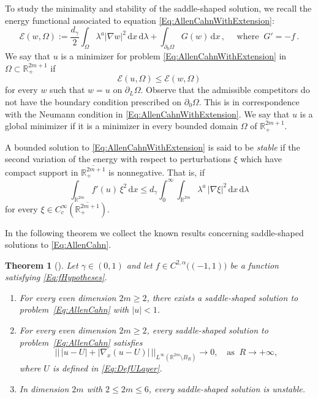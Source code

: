 \documentclass[twoside,leqno,symbols-for-thanks, draft]{rmi}
\numberwithin{equation}{section}
\newtheorem{theorem}{Theorem}[section]
\theoremstyle{definition}
\newcommand{\con}[1]{\mathbb{#1}}
\newcommand{\R}{\con{R}} %
\newcommand{\ecal}{\mathcal{E}}
\newcommand{\s}{\gamma}
\renewcommand{\d}{\,\mathrm{d}} %
\begin{document}
To study the minimality and stability of the saddle-shaped solution, we recall the energy functional associated to equation \eqref{Eq:AllenCahnWithExtension}:
$$
\ecal (w, \Omega) := \dfrac{d_\s}{2}\int_{\Omega} \lambda^a | \nabla w |^2 \d x \d \lambda + \int_{\partial_0 \Omega} G(w)\d x\,, \quad \text{ where }\ G' = -f\,.
$$
We say that $u$ is a minimizer for problem \eqref{Eq:AllenCahnWithExtension} in  $\Omega \subset \R^{2m+1}_+$ if
$$
\ecal(u,\Omega) \leq \ecal(w,\Omega)
$$
for every $w$ such that $w=u$ on $\partial_L \Omega$. Observe that the admissible competitors do not have the boundary condition prescribed on $\partial_0\Omega$. This is in correspondence with the Neumann condition in \eqref{Eq:AllenCahnWithExtension}. We say that $u$ is a global minimizer if it is a minimizer in every bounded domain $\Omega$ of $\R^{2m+1}_+$.

A bounded solution to \eqref{Eq:AllenCahnWithExtension} is said to be \emph{stable} if the second variation of the energy with respect to perturbations $\xi$ which have compact support in $\overline{\R^{2m+1}_+}$ is nonnegative. That is, if
\begin{equation}
\label{Eq:StabilityCondition}
\int_{\R^{2m}} f'(u) \, \xi^2 \d x  \leq d_\s \int_0^\infty \int_{\R^{2m}} \lambda^a \, |\nabla \xi|^2 \d x \d \lambda 
\end{equation}
for every $\xi \in C^\infty_c(\overline{\R^{2m+1}_+})$.

In the following theorem we collect the known results concerning saddle-shaped solutions to \eqref{Eq:AllenCahn}. 

\begin{theorem}[\cite{Cinti-Saddle,Cinti-Saddle2,CabreSolaMorales,CabreSireII}]
	\label{Th:Summary}
	Let $\s \in (0,1)$  and let $f\in C^{2,\alpha}\big((-1,1)\big)$ be a function satisfying \eqref{Eq:fHypotheses}.
	\begin{enumerate}[label=(\roman{*})]
		\item For every even dimension $2m\geq 2$, there exists a saddle-shaped solution to  problem~\eqref{Eq:AllenCahn} with $|u|<1$.
		\item For every even dimension $2m\geq 2$, every saddle-shaped solution to problem~\eqref{Eq:AllenCahn} satisfies
		$$ \big|\big| \, |u-U| + |\nabla_x(u-U)| \, \big|\big|_{L^\infty(\R^{2m}\setminus B_R)} \to 0, \ \ \ \text{ as } \ R\to+\infty, $$
		where $U$ is defined in \eqref{Eq:DefULayer}.
		\item In  dimension $2m$ with $2\leq 2m \leq 6$, every saddle-shaped solution is unstable.
	\end{enumerate}
\end{theorem}
\end{document}
